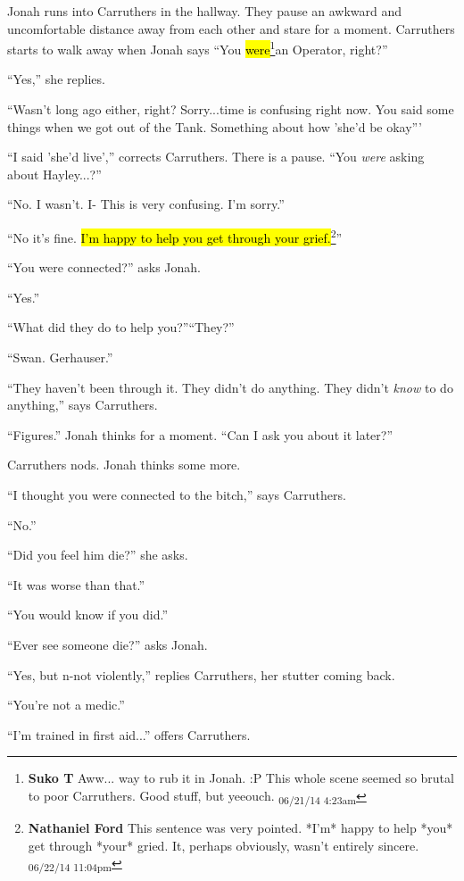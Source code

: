 Jonah runs into Carruthers in the hallway.  They pause an awkward and uncomfortable distance away from each other and stare for a moment.   Carruthers starts to walk away when Jonah says ``You \hl{were}\footnote{\textbf{Suko T }Aww... way to rub it in Jonah. :P  This whole scene seemed so brutal to poor Carruthers.  Good stuff, but yeeouch. \textsubscript{06/21/14 4:23am}}an Operator, right?''

``Yes,'' she replies.

``Wasn't long ago either, right?  Sorry...time is confusing right now.  You said some things when we got out of the Tank.  Something about how 'she'd be okay'''

``I said 'she'd live','' corrects Carruthers.  There is a pause.  ``You \textit{were }asking about Hayley...?''

``No.  I wasn't.  I- This is very confusing.  I'm sorry.''

``No it's fine. \hl{I'm happy to help you get through your grief.}\footnote{\textbf{Nathaniel Ford }This sentence was very pointed. *I'm* happy to help *you* get through *your* gried. It, perhaps obviously, wasn't entirely sincere. \textsubscript{06/22/14 11:04pm}}''

``You were connected?'' asks Jonah.

``Yes.''

``What did they do to help you?''``They?''

``Swan.  Gerhauser.''

``They haven't been through it.  They didn't do anything.  They didn't \textit{know }to do anything,'' says Carruthers.

``Figures.''  Jonah thinks for a moment.  ``Can I ask you about it later?''

Carruthers nods.   Jonah thinks some more.

``I thought you were connected to the bitch,'' says Carruthers.

``No.''

``Did you feel him die?'' she asks.

``It was worse than that.''

``You would know if you did.''

``Ever see someone die?'' asks Jonah.

``Yes, but n-not violently,'' replies Carruthers, her stutter coming back.

``You're not a medic.''

``I'm trained in first aid...'' offers Carruthers.


